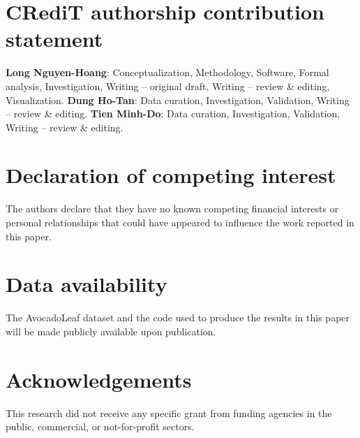 \section*{CRediT authorship contribution statement}
\textbf{Long Nguyen-Hoang}: Conceptualization, Methodology, Software, Formal analysis, Investigation, Writing -- original draft, Writing -- review \& editing, Visualization.
\textbf{Dung Ho-Tan}: Data curation, Investigation, Validation, Writing -- review \& editing.
\textbf{Tien Minh-Do}: Data curation, Investigation, Validation, Writing -- review \& editing.

\section*{Declaration of competing interest}
The authors declare that they have no known competing financial interests or personal relationships that could have appeared to influence the work reported in this paper.

\section*{Data availability}
The AvocadoLeaf dataset and the code used to produce the results in this paper will be made publicly available upon publication.

\section*{Acknowledgements}
This research did not receive any specific grant from funding agencies in the public, commercial, or not-for-profit sectors.

